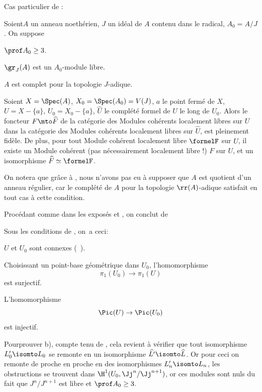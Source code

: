 \pagebreak[2]
Cas particulier de :

\begin{corollaire} \label{XII.4.5}
Soient\pageoriginaled $A$ un anneau noeth\'erien, $J$ un id\'eal de $A$ contenu dans le radical, $A_0=A/J$. On suppose
\begin{enumeratei}
\item
$\prof A_0\geq 3$.
\item
$\gr_J(A)$ est un $A_0$-module libre.
\item
$A$ est complet pour la topologie $J$-adique.
\end{enumeratei}

Soient $X=\Spec(A)$, $X_0=\Spec(A_0)=V(J)$, $a$ le point ferm\'e de $X$, $U=X-\{a\}$, $U_0=X_0-\{a\}$, $\widehat{U}$ le compl\'et\'e formel de $U$ le long de $U_0$. Alors le foncteur $F\mto \widehat{F}$ de la cat\'egorie des Modules coh\'erents localement libres sur $U$ dans la cat\'egorie des Modules coh\'erents localement libres sur $\widehat{U}$, est pleinement fid\`ele. De plus, pour tout Module coh\'erent localement libre $\formelF$ sur $\widehat{U}$, il existe un Module coh\'erent (pas n\'ecessairement localement libre !) $F$ sur $U$, et un isomorphisme $\widehat{F}\simeq\formelF$.
\end{corollaire}

On notera que gr\^ace \`a , nous n'avons pas eu \`a supposer que $A$ est quotient d'un anneau r\'egulier, car le compl\'et\'e de $A$ pour la topologie $\rr(A)$-adique satisfait en tout cas \`a cette condition.

Proc\'edant comme dans les expos\'es  et , on conclut de 

\begin{corollaire} \label{XII.4.6}
Sous les conditions de , on~a ceci:
\begin{enumeratea}
\item
$U$ et $U_0$ sont connexes (~).

Choisissant un point-base g\'eom\'etrique dans $U_0$, l'homomorphisme
\[
\pi_1(U_0)\to \pi_1(U)
\]
est surjectif.
\item
L'homomorphisme
\[
\Pic(U)\to \Pic(U_0)
\]
est injectif.
\end{enumeratea}
\end{corollaire}

Pour\pageoriginale prouver b), compte tenu de , cela revient \`a v\'erifier que tout isomorphisme $L_0'\isomto L_0$ se remonte en un isomorphisme $\widehat{L'}\isomto \widehat{L}$. Or pour ceci on remonte de proche en proche en des isomorphismes $L_n'\isomto L_n$, les obstructions se trouvent dans $\H^1(U_0, \Jj^n/\Jj^{n+1})$, or ces modules sont nuls du fait que $J^n/J^{n+1}$ est libre et $\prof A_0\geq 3$.

